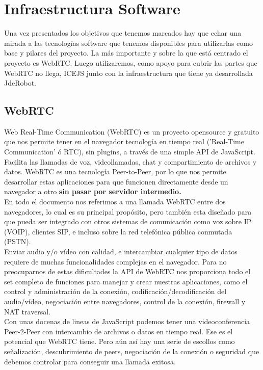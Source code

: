 \chapter{Infraestructura Software} 

Una vez presentados los objetivos que tenemos marcados hay que echar una mirada a las tecnologías software que tenemos disponibles para utilizarlas como base y pilares del proyecto. La más importante y sobre la que está centrado el proyecto es WebRTC. Luego utilizaremos, como apoyo para cubrir las partes que WebRTC no llega, ICEJS junto con la infraestructura que tiene ya desarrollada JdeRobot.


\section{WebRTC}

Web Real-Time Communication (WebRTC) es un proyecto opensource y gratuito que nos permite tener en el navegador tecnología en tiempo real ('Real-Time Communication' ó RTC), sin plugins, a través de una simple API de JavaScript. Facilita las llamadas de voz, videollamadas, chat y compartimiento de archivos y datos. WebRTC es una tecnología Peer-to-Peer, por lo que nos permite desarrollar estas aplicaciones para que funcionen directamente desde un navegador a otro \textbf{sin pasar por servidor intermedio.} \\

En todo el documento nos referimos a una llamada WebRTC entre dos navegadores, lo cual es su principal propósito, pero también esta diseñado para que pueda ser integrado con otros sistemas de comunicación como voz sobre IP (VOIP), clientes SIP, e incluso sobre la red telefónica pública conmutada (PSTN).\\

Enviar audio y/o vídeo con calidad, e intercambiar cualquier tipo de datos requiere de muchas funcionalidades complejas en el navegador. Para no preocuparnos de estas dificultades la API de WebRTC nos proporciona todo el set completo de funciones para manejar y crear nuestras aplicaciones, como el control y administración de la conexión, codificación/decodificación del audio/vídeo, negociación entre navegadores, control de la conexión, firewall y NAT traversal.\\

Con unas docenas de lineas de JavaScript podemos tener una videoconferencia Peer-2-Peer con intercambio de archivos o datos en tiempo real. Ese es el potencial que WebRTC tiene. Pero aún así hay una serie de escollos como señalización, descubrimiento de peers, negociación de la conexión o seguridad que debemos controlar para conseguir una llamada exitosa.\\

